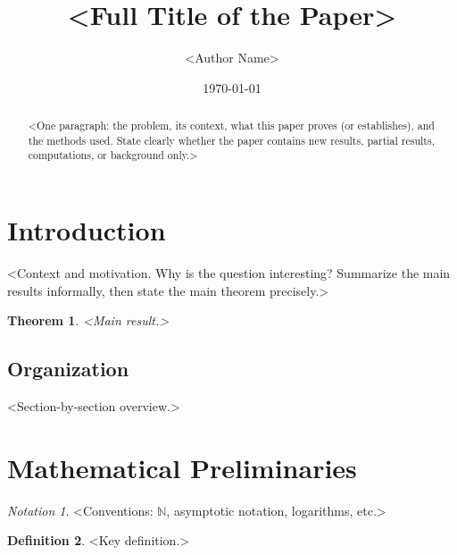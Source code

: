 \documentclass[11pt]{amsart}
\title[<Short title>]{<Full Title of the Paper>}
\author{<Author Name>}
\date{\today}
\theoremstyle{plain}
\newtheorem{theorem}{Theorem}[section]
\theoremstyle{definition}
\newtheorem{definition}[theorem]{Definition}
\theoremstyle{remark}
\newtheorem*{notation}{Notation}
\numberwithin{equation}{section}
\newcommand{\N}{\mathbb{N}}
\begin{document}
\begin{abstract}
<One paragraph: the problem, its context, what this paper proves (or establishes), and the methods used. State clearly whether the paper contains new results, partial results, computations, or background only.>
\end{abstract}

\maketitle

\noindent{}

\tableofcontents

\section{Introduction}\label{sec:intro}
<Context and motivation. Why is the question interesting? Summarize the main results informally, then state the main theorem precisely.>

\begin{theorem}\label{thm:main}
<Main result.>
\end{theorem}

\subsection*{Organization}
<Section-by-section overview.>

\section{Mathematical Preliminaries}\label{sec:prelim}
\begin{notation}
<Conventions: $\N$, asymptotic notation, logarithms, etc.>
\end{notation}

\begin{definition}\label{def:key}
<Key definition.>
\end{definition}
\end{document}
